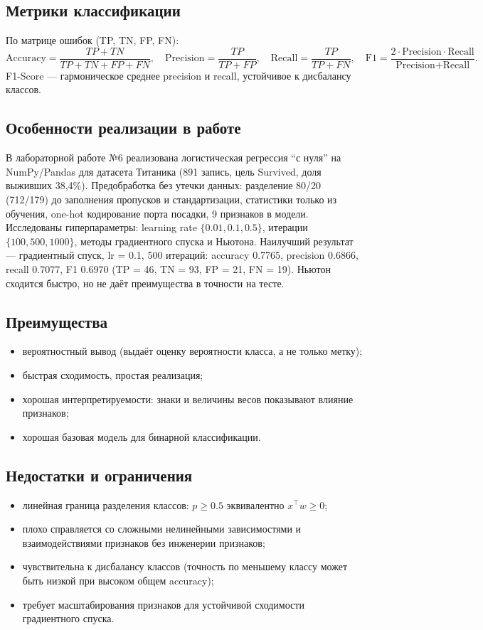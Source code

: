 \documentclass[12pt,a4paper]{article}
\begin{document}
\subsection{Метрики классификации}
По матрице ошибок (TP, TN, FP, FN):
\begin{equation}
\text{Accuracy} = \frac{TP+TN}{TP+TN+FP+FN},\quad
\text{Precision} = \frac{TP}{TP+FP},\quad
\text{Recall} = \frac{TP}{TP+FN},\quad
\text{F1} = \frac{2\cdot\text{Precision}\cdot\text{Recall}}{\text{Precision}+\text{Recall}}.
\end{equation}
F1-Score --- гармоническое среднее precision и recall, устойчивое к дисбалансу классов.

\subsection{Особенности реализации в работе}
В лабораторной работе №6 реализована логистическая регрессия ``с нуля'' на NumPy/Pandas для датасета Титаника (891 запись, цель Survived, доля выживших 38,4\%). Предобработка без утечки данных: разделение 80/20 (712/179) до заполнения пропусков и стандартизации, статистики только из обучения, one-hot кодирование порта посадки, 9 признаков в модели. Исследованы гиперпараметры: learning rate $\{0.01, 0.1, 0.5\}$, итерации $\{100, 500, 1000\}$, методы градиентного спуска и Ньютона. Наилучший результат --- градиентный спуск, lr = 0.1, 500 итераций: accuracy 0.7765, precision 0.6866, recall 0.7077, F1 0.6970 (TP = 46, TN = 93, FP = 21, FN = 19). Ньютон сходится быстро, но не даёт преимущества в точности на тесте.

\subsection{Преимущества}
\begin{itemize}
\item вероятностный вывод (выдаёт оценку вероятности класса, а не только метку);
\item быстрая сходимость, простая реализация;
\item хорошая интерпретируемости: знаки и величины весов показывают влияние признаков;
\item хорошая базовая модель для бинарной классификации.
\end{itemize}

\subsection{Недостатки и ограничения}
\begin{itemize}
\item линейная граница разделения классов: $p \ge 0.5$ эквивалентно $x^\top w \ge 0$;
\item плохо справляется со сложными нелинейными зависимостями и взаимодействиями признаков без инженерии признаков;
\item чувствительна к дисбалансу классов (точность по меньшему классу может быть низкой при высоком общем accuracy);
\item требует масштабирования признаков для устойчивой сходимости градиентного спуска.
\end{itemize}
\end{document}
